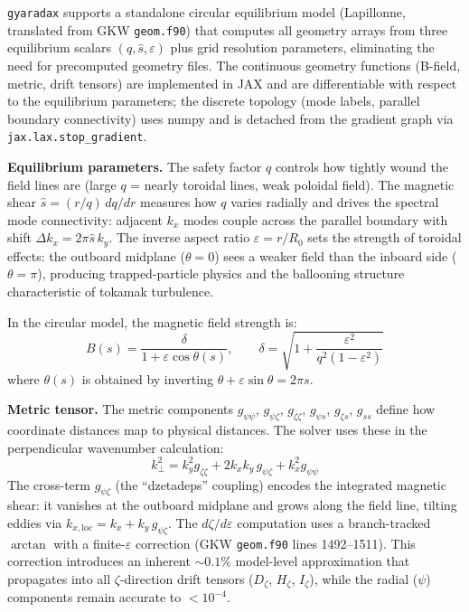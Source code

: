 \documentclass{article}
\theoremstyle{plain}
\theoremstyle{definition}
\theoremstyle{remark}
\begin{document}
\texttt{gyaradax} supports a standalone circular equilibrium model (Lapillonne, translated from GKW \texttt{geom.f90}) that computes all geometry arrays from three equilibrium scalars $(q, \hat{s}, \varepsilon)$ plus grid resolution parameters, eliminating the need for precomputed geometry files. The continuous geometry functions (B-field, metric, drift tensors) are implemented in JAX and are differentiable with respect to the equilibrium parameters; the discrete topology (mode labels, parallel boundary connectivity) uses numpy and is detached from the gradient graph via \texttt{jax.lax.stop\_gradient}.

\textbf{Equilibrium parameters.}
The safety factor $q$ controls how tightly wound the field lines are (large $q$ = nearly toroidal lines, weak poloidal field). The magnetic shear $\hat{s} = (r/q)\,dq/dr$ measures how $q$ varies radially and drives the spectral mode connectivity: adjacent $k_x$ modes couple across the parallel boundary with shift $\Delta k_x = 2\pi\hat{s}\,k_y$. The inverse aspect ratio $\varepsilon = r/R_0$ sets the strength of toroidal effects: the outboard midplane ($\theta=0$) sees a weaker field than the inboard side ($\theta=\pi$), producing trapped-particle physics and the ballooning structure characteristic of tokamak turbulence.

In the circular model, the magnetic field strength is:
\begin{equation}
B(s) = \frac{\delta}{1 + \varepsilon\cos\theta(s)}, \qquad \delta = \sqrt{1 + \frac{\varepsilon^2}{q^2(1-\varepsilon^2)}}
\label{eq:bn_circ}
\end{equation}
where $\theta(s)$ is obtained by inverting $\theta + \varepsilon\sin\theta = 2\pi s$.

\textbf{Metric tensor.}
The metric components $g_{\psi\psi}$, $g_{\psi\zeta}$, $g_{\zeta\zeta}$, $g_{\psi s}$, $g_{\zeta s}$, $g_{ss}$ define how coordinate distances map to physical distances. The solver uses these in the perpendicular wavenumber calculation:
\begin{equation}
k_\perp^2 = k_y^2 g_{\zeta\zeta} + 2 k_x k_y\, g_{\psi\zeta} + k_x^2 g_{\psi\psi}
\end{equation}
The cross-term $g_{\psi\zeta}$ (the ``dzetadeps'' coupling) encodes the integrated magnetic shear: it vanishes at the outboard midplane and grows along the field line, tilting eddies via $k_{x,\text{loc}} = k_x + k_y\, g_{\psi\zeta}$.
The $d\zeta/d\varepsilon$ computation uses a branch-tracked $\arctan$ with a finite-$\varepsilon$ correction (GKW \texttt{geom.f90} lines 1492--1511). This correction introduces an inherent $\sim 0.1\%$ model-level approximation that propagates into all $\zeta$-direction drift tensors ($D_\zeta$, $H_\zeta$, $I_\zeta$), while the radial ($\psi$) components remain accurate to $< 10^{-4}$.
\end{document}

